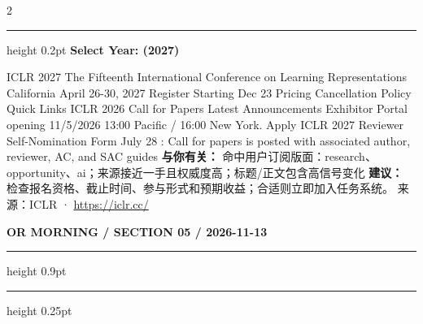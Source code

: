 \documentclass[10.5pt]{ctexart}
\begin{document}
\begin{multicols}{2}
\vspace{2mm}
\hrule height 0.2pt
\vspace{2mm}
{\large\bfseries Select Year: (2027)}\par
ICLR 2027 The Fifteenth International Conference on Learning Representations California April 26-30, 2027 Register Starting Dec 23 Pricing Cancellation Policy Quick Links ICLR 2026 Call for Papers Latest Announcements Exhibitor Portal opening 11/5/2026 13:00 Pacific / 16:00 New York. Apply ICLR 2027 Reviewer Self-Nomination Form July 28 : Call for papers is posted with associated author, reviewer, AC, and SAC guides 
\textbf{与你有关：} 命中用户订阅版面：research、opportunity、ai；来源接近一手且权威度高；标题/正文包含高信号变化
\textbf{建议：} 检查报名资格、截止时间、参与形式和预期收益；合适则立即加入任务系统。
{\footnotesize\color{ormuted} 来源：ICLR · \url{https://iclr.cc/}}
\end{multicols}
\newpage
{\small\bfseries OR MORNING / SECTION 05 / 2026-11-13}
\vspace{2mm}
\hrule height 0.9pt
\vspace{1.5mm}
\hrule height 0.25pt
\vspace{4mm}
\end{document}
